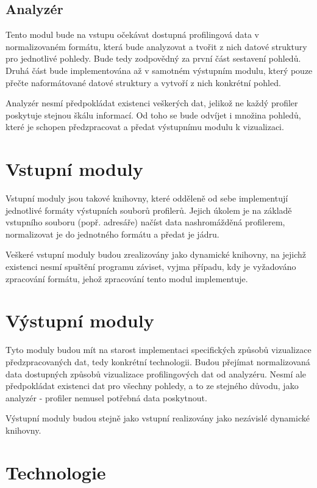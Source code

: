 \documentclass[czech,BP]{thesiskiv}
\begin{document}
\subsection{Analyzér}

Tento modul bude na vstupu očekávat dostupná profilingová data v normalizovaném formátu, která bude analyzovat a tvořit z nich datové struktury pro jednotlivé pohledy. Bude tedy zodpovědný za první část sestavení pohledů. Druhá část bude implementována až v samotném výstupním modulu, který pouze přečte naformátované datové struktury a vytvoří z nich konkrétní pohled.

Analyzér nesmí předpokládat existenci veškerých dat, jelikož ne každý profiler poskytuje stejnou škálu informací. Od toho se bude odvíjet i množina pohledů, které je schopen předzpracovat a předat výstupnímu modulu k vizualizaci.

\section{Vstupní moduly}

Vstupní moduly jsou takové knihovny, které odděleně od sebe implementují jednotlivé formáty výstupních souborů profilerů. Jejich úkolem je na základě vstupního souboru (popř. adresáře) načíst data nashromážděná profilerem, normalizovat je do jednotného formátu a předat je jádru. 

Veškeré vstupní moduly budou zrealizovány jako dynamické knihovny, na jejichž existenci nesmí spuštění programu záviset, vyjma případu, kdy je vyžadováno zpracování formátu, jehož zpracování tento modul implementuje.

\section{Výstupní moduly}

Tyto moduly budou mít na starost implementaci specifických způsobů vizualizace předzpracovaných dat, tedy konkrétní technologii. Budou přejímat normalizovaná data dostupných způsobů vizualizace profilingových dat od analyzéru. Nesmí ale předpokládat existenci dat pro všechny pohledy, a to ze stejného důvodu, jako analyzér - profiler nemusel potřebná data poskytnout.

Výstupní moduly budou stejně jako vstupní realizovány jako nezávislé dynamické knihovny.

\section{Technologie}
\end{document}
